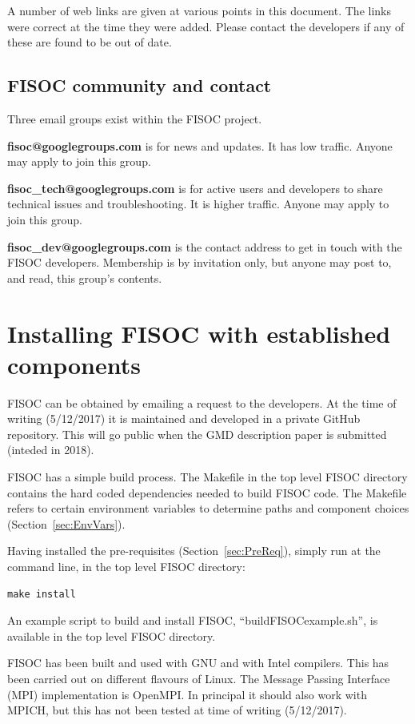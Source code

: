 \documentclass[11pt]{article}
\begin{document}
A number of web links are given at various points in this document.  
The links were correct at the time they were added. 
Please contact the developers if any of these are found to be out of date. 

\subsection{FISOC community and contact}

Three email groups exist within the FISOC project.

\textbf{fisoc@googlegroups.com} is for news and updates. 
It has low traffic. 
Anyone may apply to join this group. 

\textbf{fisoc\_tech@googlegroups.com} is for active users and developers to
share technical issues and troubleshooting.
It is higher traffic.
Anyone may apply to join this group. 

\textbf{fisoc\_dev@googlegroups.com} is the contact address to get in touch
with the FISOC developers.
Membership is by invitation only, but anyone may post to, and read, this group's contents.




\section{Installing FISOC with established components}
\label{sec:FISOC_install}

FISOC can be obtained by emailing a request to the developers.  
At the time of writing (5/12/2017) it is maintained and developed in a 
private GitHub repository.  
This will go public when the GMD description paper is 
submitted (inteded in 2018).

FISOC has a simple build process.  The Makefile in the top level FISOC directory contains the 
hard coded dependencies needed to build FISOC code.  The Makefile refers to certain 
environment variables to determine paths and component choices (Section~\ref{sec:EnvVars}). 

Having installed the pre-requisites (Section~\ref{sec:PreReq}), simply run at the command line, 
in the top level FISOC directory:
\begin{lstlisting}
make install
\end{lstlisting}

An example script to build and install FISOC, ``buildFISOCexample.sh'', is available in the top 
level FISOC directory.

FISOC has been built and used with GNU and with Intel compilers. 
This has been carried out on different flavours of Linux. 
The Message Passing Interface (MPI) implementation is OpenMPI. 
In principal it should also work with MPICH, but this has not been tested at time of writing (5/12/2017). 
\end{document}

